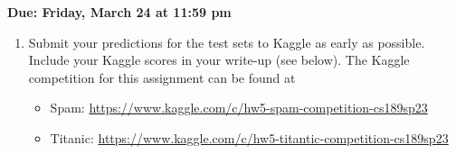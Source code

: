 \documentclass[11pt]{article}
\begin{document}
\maketitle

\textbf{Due: Friday, March 24 at 11:59 pm}

\begin{enumerate}[]
  \item
    Submit your predictions for the test sets to Kaggle as early as possible. Include your Kaggle scores in your write-up (see below).
    The Kaggle competition for this assignment can be found at
    \begin{itemize}
        \item Spam: \url{https://www.kaggle.com/c/hw5-spam-competition-cs189sp23}
        \item Titanic: \url{https://www.kaggle.com/c/hw5-titantic-competition-cs189sp23}
    \end{itemize}


\end{enumerate}
\end{document}
